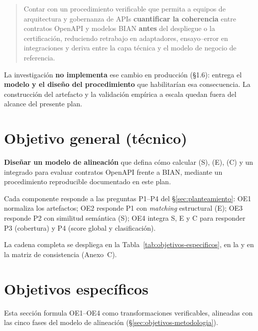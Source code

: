 \begin{quote}
  Contar con un procedimiento verificable que permita a equipos de arquitectura y gobernanza de APIs
  \textbf{cuantificar la coherencia} entre contratos OpenAPI y modelos BIAN \textbf{antes} del
  despliegue o la certificación, reduciendo retrabajo en adaptadores, ensayo--error en integraciones
  y deriva entre la capa técnica y el modelo de negocio de referencia.
\end{quote}

La investigación \textbf{no implementa} ese cambio en producción (§1.6): entrega el
\textbf{modelo y el diseño del procedimiento} que habilitarían esa consecuencia. La construcción del
artefacto y la validación empírica a escala quedan fuera del alcance del presente plan.

\section{Objetivo general (técnico)}

\textbf{Diseñar un modelo de alineación} que defina cómo calcular \SemanticScore{} (S),
\StructuralScore{} (E), \CoverageScore{} (C) y un \AlignmentScore{} integrado para evaluar contratos
OpenAPI frente a \ServiceDomain{} BIAN, mediante un procedimiento reproducible documentado en este
plan.

Cada componente responde a las preguntas P1--P4 del §\ref{sec:planteamiento}: OE1 normaliza los
artefactos; OE2 responde P1 con \textit{matching} estructural (E); OE3 responde P2 con similitud
semántica (S); OE4 integra S, E y C para responder P3 (cobertura) y P4 (score global y
clasificación).

La cadena completa se despliega en la Tabla~\ref{tab:objetivos-especificos}, en la
 y en la matriz de consistencia (Anexo~C).

\section{Objetivos específicos}

Esta sección formula OE1--OE4 como transformaciones verificables, alineadas con las cinco fases del
modelo de alineación (§\ref{sec:objetivos-metodologia}).

